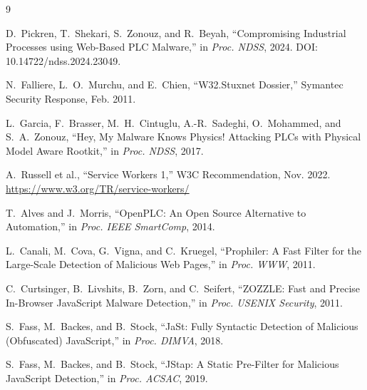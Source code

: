 \documentclass[conference]{IEEEtran}
\begin{document}
\begin{thebibliography}{9}

D.~Pickren, T.~Shekari, S.~Zonouz, and R.~Beyah,
``Compromising Industrial Processes using Web-Based PLC Malware,''
in \emph{Proc. NDSS}, 2024.
DOI: 10.14722/ndss.2024.23049.

N.~Falliere, L.~O.~Murchu, and E.~Chien,
``W32.Stuxnet Dossier,''
Symantec Security Response, Feb. 2011.

L.~Garcia, F.~Brasser, M.~H.~Cintuglu, A.-R.~Sadeghi, O.~Mohammed,
and S.~A.~Zonouz,
``Hey, My Malware Knows Physics! Attacking PLCs with Physical Model Aware Rootkit,''
in \emph{Proc. NDSS}, 2017.

A.~Russell et al., ``Service Workers 1,''
W3C Recommendation, Nov. 2022.
\url{https://www.w3.org/TR/service-workers/}

T.~Alves and J.~Morris,
``OpenPLC: An Open Source Alternative to Automation,''
in \emph{Proc. IEEE SmartComp}, 2014.

L.~Canali, M.~Cova, G.~Vigna, and C.~Kruegel,
``Prophiler: A Fast Filter for the Large-Scale Detection of Malicious Web Pages,''
in \emph{Proc. WWW}, 2011.

C.~Curtsinger, B.~Livshits, B.~Zorn, and C.~Seifert,
``ZOZZLE: Fast and Precise In-Browser JavaScript Malware Detection,''
in \emph{Proc. USENIX Security}, 2011.

S.~Fass, M.~Backes, and B.~Stock,
``JaSt: Fully Syntactic Detection of Malicious (Obfuscated) JavaScript,''
in \emph{Proc. DIMVA}, 2018.

S.~Fass, M.~Backes, and B.~Stock,
``JStap: A Static Pre-Filter for Malicious JavaScript Detection,''
in \emph{Proc. ACSAC}, 2019.

\end{thebibliography}
\end{document}
